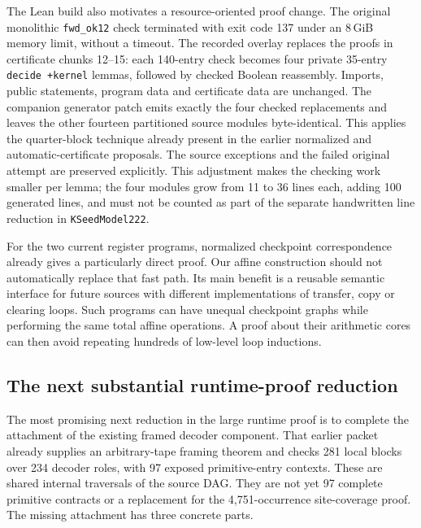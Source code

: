 \documentclass[11pt,letterpaper]{article}
\theoremstyle{definition}\newtheorem{definition}[theorem]{Definition}
\begin{document}
The Lean build also motivates a resource-oriented proof change. The original
monolithic \texttt{fwd\_ok12} check terminated with exit code 137 under
an 8\,GiB memory limit, without a timeout. The recorded overlay replaces the proofs in certificate
chunks 12--15: each 140-entry check becomes four private 35-entry
\texttt{decide +kernel} lemmas, followed by checked Boolean reassembly.
Imports, public statements, program data and certificate data are unchanged.
The companion generator patch emits exactly the four checked replacements
and leaves the other fourteen partitioned source modules byte-identical.
This applies the quarter-block technique already present in the earlier
normalized and automatic-certificate proposals. The source exceptions and
the failed original attempt are preserved explicitly. This adjustment makes
the checking work smaller per lemma; the four modules grow from 11 to 36 lines
each, adding 100 generated lines, and
must not be counted as part of the separate handwritten line reduction in
\texttt{KSeedModel222}.

For the two current register programs, normalized checkpoint correspondence
already gives a particularly direct proof. Our affine construction should not
automatically replace that fast path. Its main benefit is a reusable semantic
interface for future sources with different implementations of transfer, copy
or clearing loops. Such programs can have unequal checkpoint graphs while
performing the same total affine operations. A proof about their arithmetic
cores can then avoid repeating hundreds of low-level loop inductions.

\subsection{The next substantial runtime-proof reduction}

The most promising next reduction in the large runtime proof is to complete
the attachment of the existing framed decoder component. That earlier packet
already supplies an arbitrary-tape framing theorem and checks 281 local blocks
over 234 decoder roles, with 97 exposed primitive-entry contexts. These are
shared internal traversals of the source DAG. They are not yet 97 complete
primitive contracts or a replacement for the 4,751-occurrence site-coverage
proof. The missing attachment has three concrete parts.
\end{document}
